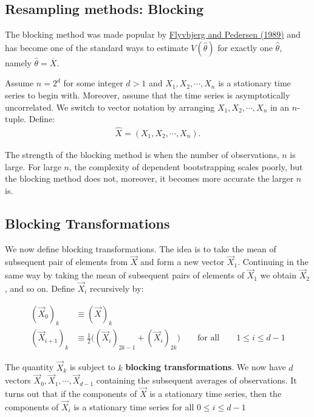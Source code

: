 \subsection*{Resampling methods: Blocking}

The blocking method was made popular by \href{{https://aip.scitation.org/doi/10.1063/1.457480}}{Flyvbjerg and Pedersen (1989)}
and has become one of the standard ways to estimate
$V(\widehat{\theta})$ for exactly one $\widehat{\theta}$, namely
$\widehat{\theta} = \overline{X}$. 

Assume $n = 2^d$ for some integer $d>1$ and $X_1,X_2,\cdots, X_n$ is a stationary time series to begin with. 
Moreover, assume that the time series is asymptotically uncorrelated. We switch to vector notation by arranging $X_1,X_2,\cdots,X_n$ in an $n$-tuple. Define:
\begin{align*}
\hat{X} = (X_1,X_2,\cdots,X_n).
\end{align*}

The strength of the blocking method is when the number of
observations, $n$ is large. For large $n$, the complexity of dependent
bootstrapping scales poorly, but the blocking method does not,
moreover, it becomes more accurate the larger $n$ is.

\subsection*{Blocking Transformations}
 We now define
blocking transformations. The idea is to take the mean of subsequent
pair of elements from $\vec{X}$ and form a new vector
$\vec{X}_1$. Continuing in the same way by taking the mean of
subsequent pairs of elements of $\vec{X}_1$ we obtain $\vec{X}_2$, and
so on. 
Define $\vec{X}_i$ recursively by:

\begin{align} 
(\vec{X}_0)_k &\equiv (\vec{X})_k \nonumber \\
(\vec{X}_{i+1})_k &\equiv \frac{1}{2}\Big( (\vec{X}_i)_{2k-1} +
(\vec{X}_i)_{2k} \Big) \qquad \text{for all} \qquad 1 \leq i \leq d-1
\end{align} 

The quantity $\vec{X}_k$ is
subject to $k$ \textbf{blocking transformations}.  We now have $d$ vectors
$\vec{X}_0, \vec{X}_1,\cdots,\vec X_{d-1}$ containing the subsequent
averages of observations. It turns out that if the components of
$\vec{X}$ is a stationary time series, then the components of
$\vec{X}_i$ is a stationary time series for all $0 \leq i \leq d-1$

